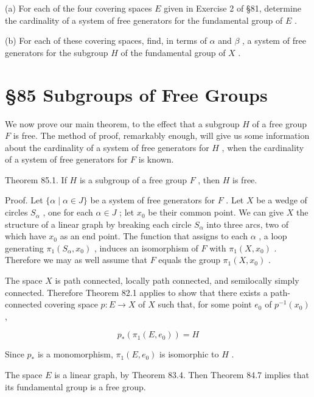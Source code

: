 (a) For each of the four covering spaces \(E\) given in Exercise 2 of  \S 81, determine the cardinality of a system of free generators for the fundamental group of \(E\) .

(b) For each of these covering spaces, find, in terms of \(\alpha\) and \(\beta\) , a system of free generators for the subgroup \(H\) of the fundamental group of \(X\) .

\section*{ \S 85 Subgroups of Free Groups}

We now prove our main theorem, to the effect that a subgroup \(H\) of a free group \(F\) is free. The method of proof, remarkably enough, will give us some information about the cardinality of a system of free generators for \(H\) , when the cardinality of a system of free generators for \(F\) is known.

Theorem 85.1. If \(H\) is a subgroup of a free group \(F\) , then \(H\) is free.

Proof. Let \(\{ \alpha  \mid  \alpha  \in  J\}\) be a system of free generators for \(F\) . Let \(X\) be a wedge of circles \({S}_{\alpha }\) , one for each \(\alpha  \in  J\) ; let \({x}_{0}\) be their common point. We can give \(X\) the structure of a linear graph by breaking each circle \({S}_{\alpha }\) into three arcs, two of which have \({x}_{0}\) as an end point. The function that assigns to each \(\alpha\) , a loop generating \({\pi }_{1}\left( {{S}_{\alpha },{x}_{0}}\right)\) , induces an isomorphism of \(F\) with \({\pi }_{1}\left( {X,{x}_{0}}\right)\) . Therefore we may as well assume that \(F\) equals the group \({\pi }_{1}\left( {X,{x}_{0}}\right)\) .

The space \(X\) is path connected, locally path connected, and semilocally simply connected. Therefore Theorem 82.1 applies to show that there exists a path-connected covering space \(p : E \rightarrow  X\) of \(X\) such that, for some point \({e}_{0}\) of \({p}^{-1}\left( {x}_{0}\right)\) ,

\[
{p}_{ * }\left( {{\pi }_{1}\left( {E,{e}_{0}}\right) }\right)  = H
\]

Since \({p}_{ * }\) is a monomorphism, \({\pi }_{1}\left( {E,{e}_{0}}\right)\) is isomorphic to \(H\) .

The space \(E\) is a linear graph, by Theorem 83.4. Then Theorem 84.7 implies that its fundamental group is a free group.

